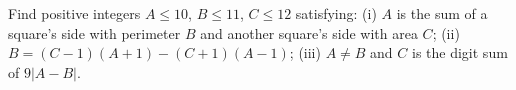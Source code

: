 Find positive integers $A\le10$, $B\le11$, $C\le12$ satisfying: (i) $A$ is the sum of a square's side with perimeter $B$ and another square's side with area $C$; (ii) $B=(C-1)(A+1)-(C+1)(A-1)$; (iii) $A\ne B$ and $C$ is the digit sum of $9|A-B|$.
